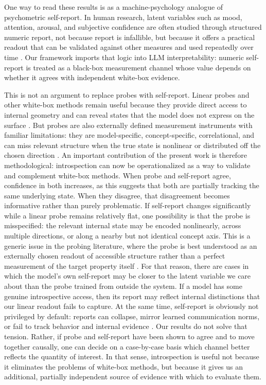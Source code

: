 \documentclass[10pt]{article}
\begin{document}
One way to read these results is as a machine-psychology analogue of psychometric self-report.
In human research, latent variables such as mood, attention, arousal, and subjective confidence are often studied through structured numeric report, not because report is infallible, but because it offers a practical readout that can be validated against other measures and used repeatedly over time \citep{Likert1932, Watson1988, CsikszentmihalyiLarson1987, Shiffman2008, FlemingLau2014}.
Our framework imports that logic into LLM interpretability: numeric self-report is treated as a black-box measurement channel whose value depends on whether it agrees with independent white-box evidence.

This is not an argument to replace probes with self-report.
Linear probes and other white-box methods remain useful because they provide direct access to internal geometry and can reveal states that the model does not express on the surface \citep{AlainBengio2018, Kim2018, GurneeTegmark2023}.
But probes are also externally defined measurement instruments with familiar limitations: they are model-specific, concept-specific, correlational, and can miss relevant structure when the true state is nonlinear or distributed off the chosen direction \citep{Belinkov2022, HewittLiang2019, Pimentel2020}.
An important contribution of the present work is therefore methodological: introspection can now be operationalized as a way to validate and complement white-box methods.
When probe and self-report agree, confidence in both increases, as this suggests that both are partially tracking the same underlying state.
When they disagree, that disagreement becomes informative rather than purely problematic.
If self-report changes significantly while a linear probe remains relatively flat, one possibility is that the probe is misspecified: the relevant internal state may be encoded nonlinearly, across multiple directions, or along a nearby but not identical concept axis.
This is a generic issue in the probing literature, where the probe is best understood as an externally chosen readout of accessible structure rather than a perfect measurement of the target property itself \citep{Belinkov2022, HewittLiang2019, Pimentel2020}.
For that reason, there are cases in which the model's own self-report may be closer to the latent variable we care about than the probe trained from outside the system.
If a model has some genuine introspective access, then its report may reflect internal distinctions that our linear readout fails to capture.
At the same time, self-report is obviously not privileged by default: reports can collapse, mirror learned communication norms, or fail to track behavior and internal evidence \citep{Xiong2024, Kumar2024, Yona2024, Han2025, Jackson2025}.
Our results do not solve that tension.
Rather, if probe and self-report have been shown to agree and to move together causally, one can decide on a case-by-case basis which channel better reflects the quantity of interest.
In that sense, introspection is useful not because it eliminates the problems of white-box methods, but because it gives us an additional, partially independent source of evidence with which to evaluate them.
\end{document}
